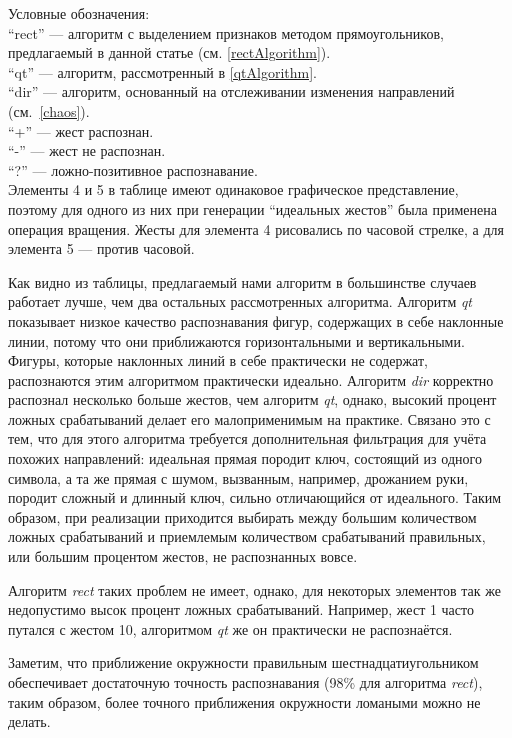 \documentclass[a5paper]{article}
\begin{document}
\newpage

Условные обозначения: \\
``rect'' --- алгоритм с выделением признаков методом прямоугольников, предлагаемый в данной статье (см. \ref{rectAlgorithm}).\\
``qt'' --- алгоритм, рассмотренный в \ref{qtAlgorithm}. \\
``dir'' --- алгоритм, основанный на отслеживании изменения направлений (см.~\ref{chaos}). \\
``+'' --- жест распознан. \\
``-'' --- жест не распознан. \\
``?'' --- ложно-позитивное распознавание. \\

Элементы 4 и 5 в таблице имеют одинаковое графическое представление, поэтому для одного из них при генерации ``идеальных жестов'' была применена операция вращения. Жесты для элемента 4 рисовались по часовой стрелке, а для элемента 5 --- против часовой.

Как видно из таблицы, предлагаемый нами алгоритм в большинстве случаев работает лучше, чем два остальных рассмотренных алгоритма. Алгоритм \textit{qt} показывает низкое качество распознавания фигур, содержащих в себе наклонные линии, потому что они приближаются горизонтальными и вертикальными. Фигуры, которые наклонных линий в себе практически не содержат, распознаются этим алгоритмом практически идеально. Алгоритм \textit{dir} корректно распознал несколько больше жестов, чем алгоритм \textit{qt}, однако, высокий процент ложных срабатываний делает его малоприменимым на практике. Связано это с тем, что для этого алгоритма требуется дополнительная фильтрация для учёта похожих направлений: идеальная прямая породит ключ, состоящий из одного символа, а та же прямая с шумом, вызванным, например, дрожанием руки, породит сложный и длинный ключ, сильно отличающийся от идеального. Таким образом, при реализации приходится выбирать между большим количеством ложных срабатываний и приемлемым количеством срабатываний правильных, или большим процентом жестов, не распознанных вовсе.

Алгоритм \textit{rect} таких проблем не имеет, однако, для некоторых элементов так же недопустимо высок процент ложных срабатываний. Например, жест 1 часто путался с жестом 10, алгоритмом \textit{qt} же он практически не распознаётся. 

Заметим, что приближение окружности правильным шестнадцатиугольником обеспечивает достаточную точность распознавания (98\% для алгоритма \textit{rect}), таким образом, более точного приближения окружности ломаными можно не делать.
\end{document}
